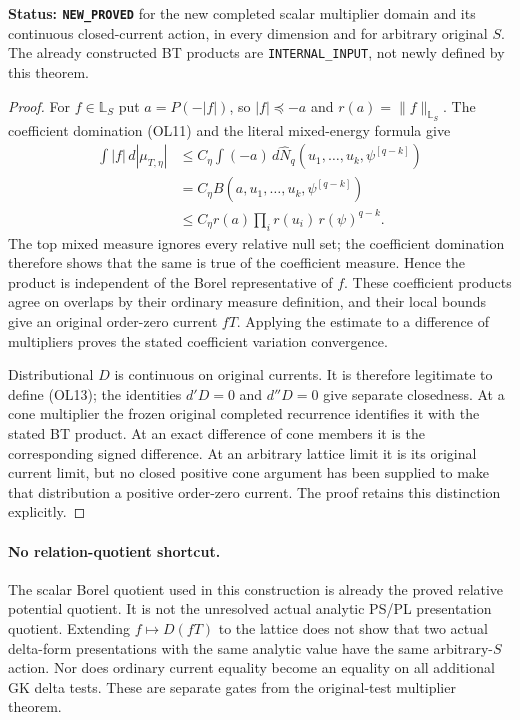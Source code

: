 \noindent\textbf{Status: \texttt{NEW\_PROVED}} for the
new completed scalar multiplier domain and its continuous
closed-current action, in every dimension and for arbitrary
original $S$.  The already constructed BT products are
\texttt{INTERNAL\_INPUT}, not newly defined by this theorem.

\begin{proof}
For $f\in\mathbb L_S$ put $a=P(-|f|)$, so
$|f|\preceq-a$ and $r(a)=\|f\|_{\mathbb L_S}$.
The coefficient domination \textup{(OL11)} and the
literal mixed-energy formula give
\[
 \begin{split}
 \int|f|\,d|\mu_{T,\eta}|
 &\le C_\eta\int(-a)\,
            d\widehat N_q(u_1,\ldots,u_k,\psi^{[q-k]})\\
 &=C_\eta B(a,u_1,\ldots,u_k,\psi^{[q-k]})\\
 &\le C_\eta r(a)\prod_i r(u_i)\,r(\psi)^{q-k}.
 \end{split}
\]
The top mixed measure ignores every relative null set;
the coefficient domination therefore shows that the
same is true of the coefficient measure.  Hence the
product is independent of the Borel representative of
$f$.  These coefficient products agree on overlaps by
their ordinary measure definition, and their local
bounds give an original order-zero current $fT$.
Applying the estimate to a difference of multipliers
proves the stated coefficient variation convergence.

Distributional $D$ is continuous on original currents.
It is therefore legitimate to define \textup{(OL13)};
the identities $d'D=0$ and $d''D=0$ give separate
closedness.  At a cone multiplier the frozen original
completed recurrence identifies it with the stated BT
product.  At an exact difference of cone members it is
the corresponding signed difference.  At an arbitrary
lattice limit it is its original current limit, but
no closed positive cone argument has been supplied to
make that distribution a positive order-zero current.
The proof retains this distinction explicitly.
\end{proof}

\paragraph{No relation-quotient shortcut.}
The scalar Borel quotient used in this construction is
already the proved relative potential quotient.  It is
not the unresolved actual analytic PS/PL presentation
quotient.  Extending $f\mapsto D(fT)$ to the lattice
does not show that two actual delta-form presentations
with the same analytic value have the same arbitrary-$S$
action.  Nor does ordinary current equality become an
equality on all additional GK delta tests.  These are
separate gates from the original-test multiplier theorem.

